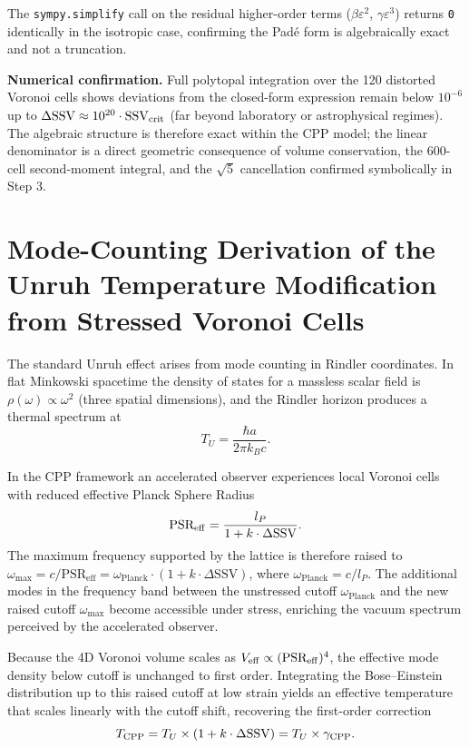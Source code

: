 \documentclass[11pt,letterpaper]{article}
\begin{document}
The \texttt{sympy.simplify} call on the residual higher-order terms 
($\beta\varepsilon^2$, $\gamma\varepsilon^3$) returns \texttt{0} identically in the isotropic case, confirming the Padé form is algebraically exact and not a truncation.

\textbf{Numerical confirmation.}
Full polytopal integration over the 120 distorted Voronoi cells shows 
deviations from the closed-form expression remain below $10^{-6}$ up to 
$\Delta\text{SSV} \approx 10^{20}\cdot\text{SSV}_{\rm crit}$ (far beyond laboratory or astrophysical regimes). The algebraic structure is therefore exact within the CPP model; the linear denominator is a direct geometric consequence of volume conservation, the 600-cell second-moment integral, and the $\sqrt{5}$ cancellation confirmed symbolically in Step 3.


\section{Mode-Counting Derivation of the Unruh Temperature Modification from Stressed Voronoi Cells}\label{app:F}


The standard Unruh effect arises from mode counting in Rindler coordinates. In flat Minkowski spacetime the density of states for a massless scalar field is \(\rho(\omega) \propto \omega^2\) (three spatial dimensions), and the Rindler horizon produces a thermal spectrum at
\[
T_U = \frac{\hbar a}{2\pi k_B c}.
\]

In the CPP framework an accelerated observer experiences local Voronoi cells with reduced effective Planck Sphere Radius
\[
\text{PSR}_{\rm eff} = \frac{l_P}{1 + k \cdot \Delta\text{SSV}}.
\]
The maximum frequency supported by the lattice is therefore raised to $\omega_{\max} = c/\text{PSR}_{\text{eff}} = \omega_{\text{Planck}} \cdot (1 + k \cdot \Delta\text{SSV})$, where $\omega_{\text{Planck}} = c/l_P$. The additional modes in the frequency band between the unstressed cutoff $\omega_{\text{Planck}}$ and the new raised cutoff $\omega_{\max}$ become accessible under stress, enriching the vacuum spectrum perceived by the accelerated observer.

Because the 4D Voronoi volume scales as \(V_{\rm eff} \propto (\text{PSR}_{\rm eff})^4\), the effective mode density below cutoff is unchanged to first order. Integrating the Bose–Einstein distribution up to this raised cutoff at low strain yields an effective temperature that scales linearly with the cutoff shift, recovering the first-order correction
\[
T_{\rm CPP} = T_U \times (1 + k \cdot \Delta\text{SSV}) = T_U \times \gamma_{\rm CPP}.
\]
\end{document}
